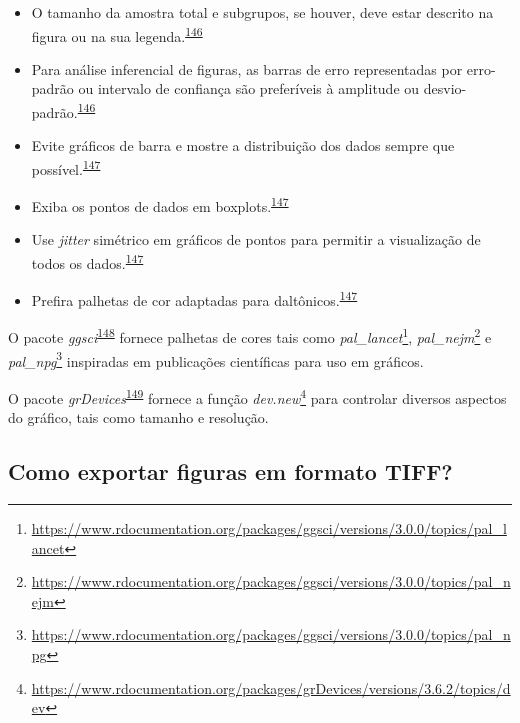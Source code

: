 \documentclass[
  a4paper,
]{book}
\renewcommand{\href}[2]{#2\footnote{\url{#1}}}
\newenvironment{infobox}[1]
  {
  \begin{itemize}
  \renewcommand{\labelitemi}{
    \raisebox{-.7\height}[0pt][0pt]{
      {\setkeys{Gin}{width=3em,keepaspectratio}
        \texttt{[image: \#1]}}
    }
  }
  \setlength{\fboxsep}{1em}
  \begin{blackbox}
  \item
  }
  {
  \end{blackbox}
  \end{itemize}
  }
\begin{document}
\begin{itemize}
\item
  O tamanho da amostra total e subgrupos, se houver, deve estar descrito na figura ou na sua legenda.\textsuperscript{\protect\hyperlink{ref-Cumming2007}{146}}
\item
  Para análise inferencial de figuras, as barras de erro representadas por erro-padrão ou intervalo de confiança são preferíveis à amplitude ou desvio-padrão.\textsuperscript{\protect\hyperlink{ref-Cumming2007}{146}}
\item
  Evite gráficos de barra e mostre a distribuição dos dados sempre que possível.\textsuperscript{\protect\hyperlink{ref-Weissgerber2019}{147}}
\item
  Exiba os pontos de dados em boxplots.\textsuperscript{\protect\hyperlink{ref-Weissgerber2019}{147}}
\item
  Use \emph{jitter} simétrico em gráficos de pontos para permitir a visualização de todos os dados.\textsuperscript{\protect\hyperlink{ref-Weissgerber2019}{147}}
\item
  Prefira palhetas de cor adaptadas para daltônicos.\textsuperscript{\protect\hyperlink{ref-Weissgerber2019}{147}}
\end{itemize}

\begin{infobox}{images/Rlogo}
O pacote \emph{ggsci}\textsuperscript{\protect\hyperlink{ref-ggsci}{148}} fornece palhetas de cores tais como \href{https://www.rdocumentation.org/packages/ggsci/versions/3.0.0/topics/pal_lancet}{\emph{pal\_lancet}}, \href{https://www.rdocumentation.org/packages/ggsci/versions/3.0.0/topics/pal_nejm}{\emph{pal\_nejm}} e \href{https://www.rdocumentation.org/packages/ggsci/versions/3.0.0/topics/pal_npg}{\emph{pal\_npg}} inspiradas em publicações científicas para uso em gráficos.

\end{infobox}

\begin{infobox}{images/Rlogo}
O pacote \emph{grDevices}\textsuperscript{\protect\hyperlink{ref-grDevices}{149}} fornece a função \href{https://www.rdocumentation.org/packages/grDevices/versions/3.6.2/topics/dev}{\emph{dev.new}} para controlar diversos aspectos do gráfico, tais como tamanho e resolução.

\end{infobox}

\hypertarget{como-exportar-figuras-em-formato-tiff}{%
\subsection{Como exportar figuras em formato TIFF?}\label{como-exportar-figuras-em-formato-tiff}}
\end{document}
